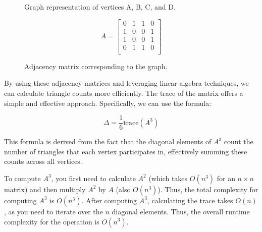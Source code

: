 \documentclass[12pt]{article}
\begin{document}
\begin{figure}[H]
    \centering
    \begin{minipage}{0.45\textwidth}
        \caption{Graph representation of vertices A, B, C, and D.}
    \end{minipage}%
    \hfill
    \begin{minipage}{0.45\textwidth}
        \[
        A =
        \begin{bmatrix}
        0 & 1 & 1 & 0 \\
        1 & 0 & 0 & 1 \\
        1 & 0 & 0 & 1 \\
        0 & 1 & 1 & 0 \\
        \end{bmatrix}
        \]
        \caption{Adjacency matrix corresponding to the graph.}
    \end{minipage}
\end{figure}

By using these adjacency matrices and leveraging linear algebra techniques, we can calculate triangle counts more efficiently. 
The trace of the matrix offers a simple and effective approach. Specifically, we can use the formula:

\[
\Delta = \frac{1}{6} \mathrm{trace}(A^3)
\]

This formula is derived from the fact that the diagonal elements of \(A^3\) count the number of triangles that each vertex participates in, effectively summing these counts across all vertices. 

To compute $A^3$, you first need to calculate $A^2$ (which takes $O(n^3)$ for an $n \times n$ matrix) and then multiply $A^2$ by $A$ (also $O(n^3)$).
Thus, the total complexity for computing $A^3$ is $O(n^3)$.
After computing $A^3$, calculating the trace takes $O(n)$, as you need to iterate over the $n$ diagonal elements.
Thus, the overall runtime complexity for the operation is $O(n^3)$.
\end{document}
